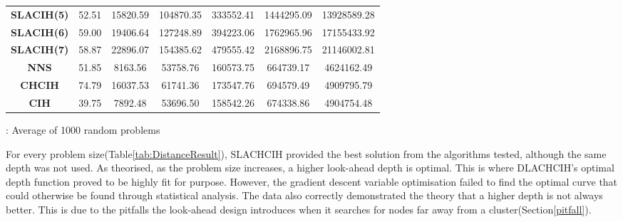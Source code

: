 \begin{landscape}
{\begin{table}[]
{\begin{tabular}{|c|cccccc|}
\rowcolor[HTML]{EFEFEF} 
\textbf{SLACIH(5)}                   & 52.51                         & 15820.59                       & 104870.35                      & 333552.41                      & 1444295.09                     & 13928589.28                     \\
\textbf{SLACIH(6)}                   & 59.00                         & 19406.64                       & 127248.89                      & 394223.06                      & 1762965.96                     & 17155433.92                     \\
\rowcolor[HTML]{EFEFEF} 
\textbf{SLACIH(7)}                   & 58.87                         & 22896.07                       & 154385.62                      & 479555.42                      & 2168896.75                     & 21146002.81                     \\
\textbf{NNS}                         & 51.85                         & 8163.56                        & 53758.76                       & 160573.75                      & 664739.17                      & 4624162.49                      \\
\rowcolor[HTML]{EFEFEF} 
\textbf{CHCIH}                       & 74.79                         & 16037.53                       & 61741.36                       & 173547.76                      & 694579.49                      & 4909795.79                      \\
\textbf{CIH}                         & 39.75                         & 7892.48                        & 53696.50                       & 158542.26                      & 674338.86                      & 4904754.48                      \\ \hline
\end{tabular}%
}
  \begin{tablenotes}[flushleft]\small
  \source: Average of 1000 random problems
  \end{tablenotes}
\end{table}
}
\pagebreak
\end{landscape}

For every problem size(Table\ref{tab:DistanceResult}), SLACHCIH provided the best solution from the algorithms tested, although the same depth was not used. As theorised, as the problem size increases, a higher look-ahead depth is optimal. This is where DLACHCIH's optimal depth function proved to be highly fit for purpose. However, the gradient descent variable optimisation failed to find the optimal curve that could otherwise be found through statistical analysis. The data also correctly demonstrated the theory that a higher depth is not always better. This is due to the pitfalls the look-ahead design introduces when it searches for nodes far away from a cluster(Section\ref{pitfall}).

